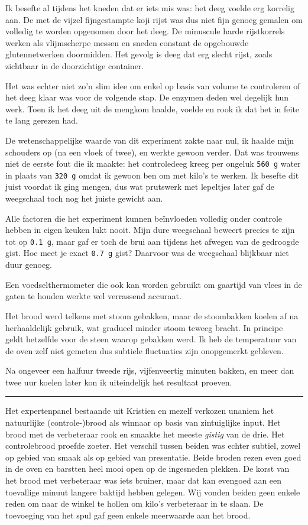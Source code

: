 \documentclass[
  11pt,
  dutch,
]{memoir}
\begin{document}
Ik besefte al tijdens het kneden dat er iets mis was: het deeg voelde
erg korrelig aan. De met de vijzel fijngestampte koji rijst was dus niet
fijn genoeg gemalen om volledig te worden opgenomen door het deeg. De
minuscule harde rijstkorrels werken als vlijmscherpe messen en sneden
constant de opgebouwde glutennetwerken doormidden. Het gevolg is deeg
dat erg slecht rijst, zoals zichtbaar in de doorzichtige container.

Het was echter niet zo'n slim idee om enkel op basis van volume te
controleren of het deeg klaar was voor de volgende stap. De enzymen
deden wel degelijk hun werk. Toen ik het deeg uit de mengkom haalde,
voelde en rook ik dat het in feite te lang gerezen had.

De wetenschappelijke waarde van dit experiment zakte naar nul, ik haalde
mijn schouders op (na een vloek of twee), en werkte gewoon verder. Dat
was trouwens niet de eerste fout die ik maakte: het controledeeg kreeg
per ongeluk \texttt{560\ g} water in plaats van \texttt{320\ g} omdat ik
gewoon ben om met kilo's te werken. Ik besefte dit juist voordat ik ging
mengen, dus wat prutswerk met lepeltjes later gaf de weegschaal toch nog
het juiste gewicht aan.

Alle factoren die het experiment kunnen beïnvloeden volledig onder
controle hebben in eigen keuken lukt nooit. Mijn dure weegschaal beweert
precies te zijn tot op \texttt{0.1\ g}, maar gaf er toch de brui aan
tijdens het afwegen van de gedroogde gist. Hoe meet je exact
\texttt{0.7\ g} gist? Daarvoor was de weegschaal blijkbaar niet duur
genoeg.

Een voedselthermometer die ook kan worden gebruikt om gaartijd van vlees
in de gaten te houden werkte wel verrassend accuraat.

Het brood werd telkens met stoom gebakken, maar de stoombakken koelen af
na herhaaldelijk gebruik, wat gradueel minder stoom teweeg bracht. In
principe geldt hetzelfde voor de steen waarop gebakken werd. Ik heb de
temperatuur van de oven zelf niet gemeten dus subtiele fluctuaties zijn
onopgemerkt gebleven.

Na ongeveer een halfuur tweede rijs, vijfenveertig minuten bakken, en
meer dan twee uur koelen later kon ik uiteindelijk het resultaat
proeven.

\pfbreak

Het expertenpanel bestaande uit Kristien en mezelf verkozen unaniem het
natuurlijke (controle-)brood als winnaar op basis van zintuiglijke
input. Het brood met de verbeteraar rook en smaakte het meeste
\emph{gistig} van de drie. Het controlebrood proefde zoeter. Het
verschil tussen beiden was echter subtiel, zowel op gebied van smaak als
op gebied van presentatie. Beide broden rezen even goed in de oven en
barstten heel mooi open op de ingesneden plekken. De korst van het brood
met verbeteraar was iets bruiner, maar dat kan evengoed aan een
toevallige minuut langere baktijd hebben gelegen. Wij vonden beiden geen
enkele reden om naar de winkel te hollen om kilo's verbeteraar in te
slaan. De toevoeging van het spul gaf geen enkele meerwaarde aan het
brood.
\end{document}
